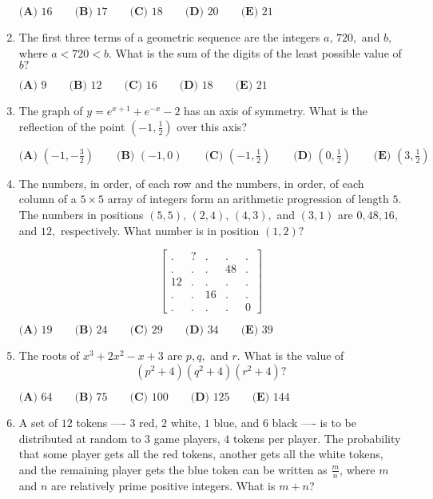 \documentclass{article}
\begin{document}
\begin{enumerate}[label=\arabic*., itemsep=0.5em]
$\textbf{(A) }16\qquad\textbf{(B) }17\qquad\textbf{(C) }18\qquad\textbf{(D) }20\qquad\textbf{(E) }21$\par \vspace{0.5em}\item The first three terms of a geometric sequence are the integers $a,\,720,$ and $b,$ where $a<720<b.$ What is the sum of the digits of the least possible value of $b?$

$\textbf{(A) } 9 \qquad \textbf{(B) } 12 \qquad \textbf{(C) } 16 \qquad \textbf{(D) } 18 \qquad \textbf{(E) } 21$\par \vspace{0.5em}\item The graph of $y=e^{x+1}+e^{-x}-2$ has an axis of symmetry. What is the reflection of the point $(-1,\tfrac{1}{2})$ over this axis?

$\textbf{(A) }\left(-1,-\frac{3}{2}\right)\qquad\textbf{(B) }(-1,0)\qquad\textbf{(C) }\left(-1,\tfrac{1}{2}\right)\qquad\textbf{(D) }\left(0,\frac{1}{2}\right)\qquad\textbf{(E) }\left(3,\frac{1}{2}\right)$\par \vspace{0.5em}\item The numbers, in order, of each row and the numbers, in order, of each column of a $5 \times 5$ array of integers form an arithmetic progression of length $5{.}$ The numbers in positions $(5, 5), \,(2,4),\,(4,3),$ and $(3, 1)$ are $0, 48, 16,$ and $12{,}$ respectively. What number is in position $(1, 2)?$

\begin{equation*}
\begin{bmatrix} . & ? &.&.&. \\ .&.&.&48&.\\ 12&.&.&.&.\\ .&.&16&.&.\\ .&.&.&.&0\end{bmatrix}
\end{equation*}

$\textbf{(A) } 19 \qquad \textbf{(B) } 24 \qquad \textbf{(C) } 29 \qquad \textbf{(D) } 34 \qquad \textbf{(E) } 39$\par \vspace{0.5em}\item The roots of $x^3 + 2x^2 - x + 3$ are $p, q,$ and $r.$ What is the value of 
\begin{equation*}
(p^2 + 4)(q^2 + 4)(r^2 + 4)?
\end{equation*}

$\textbf{(A) } 64 \qquad \textbf{(B) } 75 \qquad \textbf{(C) } 100 \qquad \textbf{(D) } 125 \qquad \textbf{(E) } 144$\par \vspace{0.5em}\item A set of $12$ tokens ---- $3$ red, $2$ white, $1$ blue, and $6$ black ---- is to be distributed at random to $3$ game players, $4$ tokens per player. The probability that some player gets all the red tokens, another gets all the white tokens, and the remaining player gets the blue token can be written as $\frac{m}{n}$, where $m$ and $n$ are relatively prime positive integers. What is $m+n$?


\end{enumerate}
\end{document}
